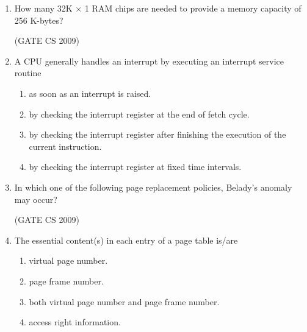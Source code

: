 \documentclass[a4paper, 11pt]{article}
\begin{document}
\begin{enumerate}
    \item How many 32K $\times$ 1 RAM chips are needed to provide a memory capacity of 256 K-bytes?\\
    \begin{enumerate}
    \end{enumerate}

    \hfill (GATE CS 2009)

    \item A CPU generally handles an interrupt by executing an interrupt service routine
    \begin{enumerate}
        \item as soon as an interrupt is raised.
        \item by checking the interrupt register at the end of fetch cycle.
        \item by checking the interrupt register after finishing the execution of the current instruction.
        \item by checking the interrupt register at fixed time intervals.
    \end{enumerate}

    \item In which one of the following page replacement policies, Belady's anomaly may occur?\\
    \begin{enumerate}
    \end{enumerate}

    \hfill (GATE CS 2009)

    \item The essential content(s) in each entry of a page table is/are
    \begin{enumerate} 
        \item virtual page number.
        \item page frame number.
        \item both virtual page number and page frame number.
        \item access right information.
    \end{enumerate}


\end{enumerate}
\end{document}
